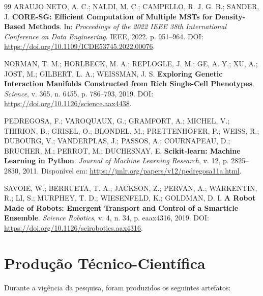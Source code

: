 \documentclass[12pt,a4paper,oneside]{article}
\begin{document}
\begin{thebibliography}{99}
ARAUJO NETO, A. C.; NALDI, M. C.; CAMPELLO, R. J. G. B.; SANDER, J.
\textbf{CORE-SG: Efficient Computation of Multiple MSTs for Density-Based Methods}.
In: \textit{Proceedings of the 2022 IEEE 38th International Conference on Data Engineering}.
IEEE, 2022. p. 951--964.
DOI: \url{https://doi.org/10.1109/ICDE53745.2022.00076}.

NORMAN, T. M.; HORLBECK, M. A.; REPLOGLE, J. M.; GE, A. Y.; XU, A.;
JOST, M.; GILBERT, L. A.; WEISSMAN, J. S.
\textbf{Exploring Genetic Interaction Manifolds Constructed from Rich Single-Cell Phenotypes}.
\textit{Science}, v. 365, n. 6455, p. 786--793, 2019.
DOI: \url{https://doi.org/10.1126/science.aax4438}.

PEDREGOSA, F.; VAROQUAUX, G.; GRAMFORT, A.; MICHEL, V.; THIRION, B.;
GRISEL, O.; BLONDEL, M.; PRETTENHOFER, P.; WEISS, R.; DUBOURG, V.;
VANDERPLAS, J.; PASSOS, A.; COURNAPEAU, D.; BRUCHER, M.; PERROT, M.;
DUCHESNAY, E.
\textbf{Scikit-learn: Machine Learning in Python}.
\textit{Journal of Machine Learning Research}, v. 12, p. 2825--2830, 2011.
Disponível em: \url{https://jmlr.org/papers/v12/pedregosa11a.html}.

SAVOIE, W.; BERRUETA, T. A.; JACKSON, Z.; PERVAN, A.; WARKENTIN, R.;
LI, S.; MURPHEY, T. D.; WIESENFELD, K.; GOLDMAN, D. I.
\textbf{A Robot Made of Robots: Emergent Transport and Control of a Smarticle Ensemble}.
\textit{Science Robotics}, v. 4, n. 34, p. eaax4316, 2019.
DOI: \url{https://doi.org/10.1126/scirobotics.aax4316}.

\end{thebibliography}

\section{Produção Técnico-Científica}

Durante a vigência da pesquisa, foram produzidos os seguintes artefatos:
\end{document}
